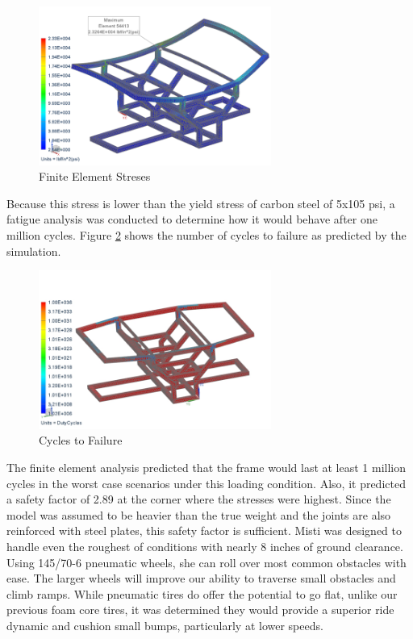 \begin{figure}[H]
\begin{center}
\includegraphics[width=3in]{./Pics/Stress.png}
\caption{Finite Element Streses}
\label{FIG:stress}
\end{center}
\end{figure}

Because this stress is lower than the yield stress of carbon steel of 5x105 psi, a fatigue analysis was conducted to determine how it would behave after one million cycles. Figure \ref{FIG:cycles} shows the number of cycles to failure as predicted by the simulation.

\begin{figure}[H]
\begin{center}
\includegraphics[width=3in]{./Pics/Cycles.png}
\caption{Cycles to Failure}
\label{FIG:cycles}
\end{center}
\end{figure}

The finite element analysis predicted that the frame would last at least 1 million cycles in the worst case scenarios under this loading condition. Also, it predicted a safety factor of 2.89 at the corner where the stresses were highest. Since the model was assumed to be heavier than the true weight and the joints are also reinforced with steel plates, this safety factor is sufficient.
Misti was designed to handle even the roughest of conditions with nearly 8 inches of ground clearance. Using 145/70-6 pneumatic wheels, she can roll over most common obstacles with ease. The larger wheels will improve our ability to traverse small obstacles and climb ramps. While pneumatic tires do offer the potential to go flat, unlike our previous foam core tires, it was determined they would provide a superior ride dynamic and cushion small bumps, particularly at lower speeds.


